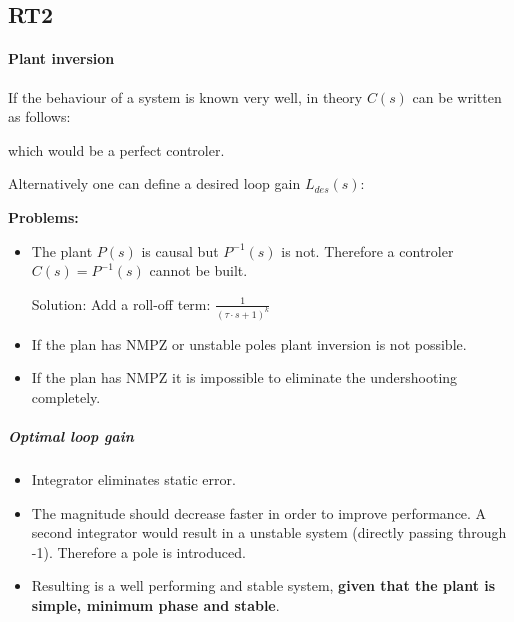 \documentclass[10pt,a4paper]{scrartcl}
\begin{document}
\begin{multicols*}{3}
	
	
	
	
	\part{RT2}
	
	\subsection{Plant inversion}
	
	If the behaviour of a system is known very well, in theory $C(s)$ can be written as follows:
	
	\finn
	
	 which would be a perfect controler.
	
	Alternatively one can define a desired loop gain $L_{des}(s)$:
	
	
	\finn	
	
	\textbf{Problems:}
	\begin{itemize}
	\compaq
	\item
	The plant $P(s)$ is causal but $P^{-1}(s)$ is not. Therefore a controler $C(s)=P^{-1}(s)$ cannot be built.
	
	Solution: Add a roll-off term: $\frac{1}{(\tau \cdot s+1)^k}$
	\item
	If the plan has NMPZ or unstable poles plant inversion is not possible.
	\item
	If the plan has NMPZ it is impossible to eliminate the undershooting completely.
	\end{itemize}	
	
	
	
	\subsubsection{Optimal loop gain}
	
	
	\begin{itemize}
	\compaq
	\item
	Integrator eliminates static error.
	\item
	The magnitude should decrease faster in order to improve performance. A second integrator would result in a unstable system (directly passing through -1). Therefore a pole is introduced.
	\item
	Resulting is a well performing and stable system, \textbf{given that the plant is simple, minimum phase and stable}.
	\end{itemize}
	

\end{multicols*}
\end{document}
